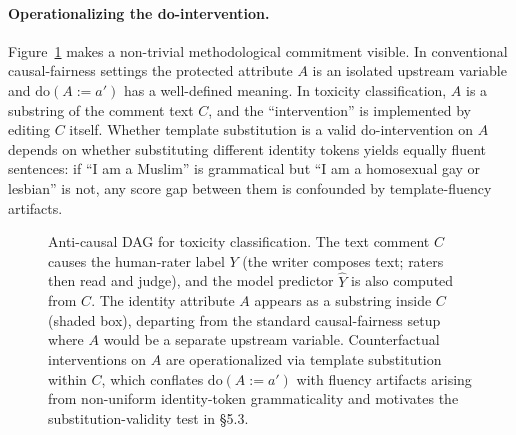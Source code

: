 \documentclass[11pt]{article}
\begin{document}
\paragraph{Operationalizing the do-intervention.} Figure~\ref{fig:anti-causal-dag} makes a non-trivial methodological commitment visible. In conventional causal-fairness settings the protected attribute $A$ is an isolated upstream variable and $\mathrm{do}(A := a')$ has a well-defined meaning. In toxicity classification, $A$ is a substring of the comment text $C$, and the ``intervention'' is implemented by editing $C$ itself. Whether template substitution is a valid do-intervention on $A$ depends on whether substituting different identity tokens yields equally fluent sentences: if ``I am a Muslim'' is grammatical but ``I am a homosexual gay or lesbian'' is not, any score gap between them is confounded by template-fluency artifacts.

\begin{figure}[h]
\centering
{}
\caption{Anti-causal DAG for toxicity classification. The text comment $C$ causes the human-rater label $Y$ (the writer composes text; raters then read and judge), and the model predictor $\hat Y$ is also computed from $C$. The identity attribute $A$ appears as a substring inside $C$ (shaded box), departing from the standard causal-fairness setup where $A$ would be a separate upstream variable. Counterfactual interventions on $A$ are operationalized via template substitution within $C$, which conflates $\mathrm{do}(A := a')$ with fluency artifacts arising from non-uniform identity-token grammaticality and motivates the substitution-validity test in \S5.3.}
\label{fig:anti-causal-dag}
\end{figure}
\end{document}
